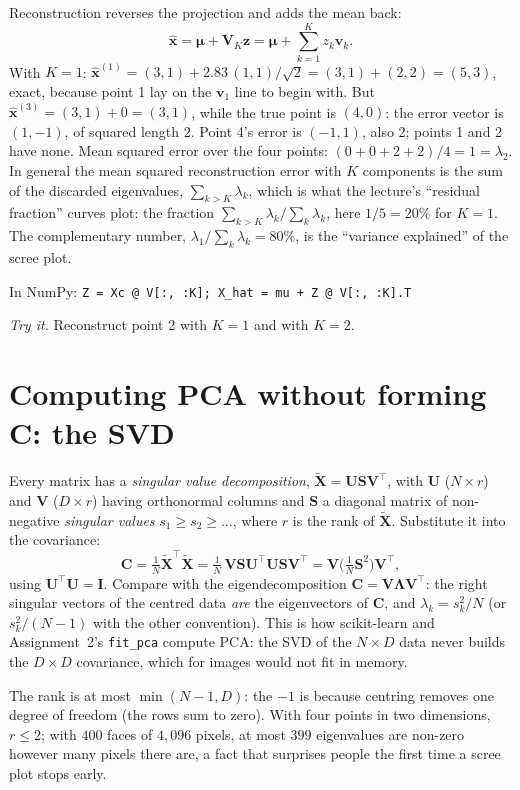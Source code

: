 \documentclass[11pt]{article}
\newcommand{\vx}{\bm{x}}
\newcommand{\vv}{\bm{v}}
\newcommand{\vz}{\bm{z}}
\newcommand{\vmu}{\bm{\mu}}
\newcommand{\mX}{\bm{X}}
\newcommand{\mC}{\bm{C}}
\newcommand{\mV}{\bm{V}}
\newcommand{\mI}{\bm{I}}
\newcommand{\mL}{\bm{\Lambda}}
\newcommand{\np}[1]{{\small\color{lightgray}In NumPy: \texttt{#1}}\par}
\begin{document}
Reconstruction reverses the projection and adds the mean back:
\[
\hat{\vx} = \vmu + \mV_K\vz = \vmu + \sum_{k=1}^{K} z_k\vv_k .
\]
With $K = 1$: $\hat{\vx}^{(1)} = (3, 1) + 2.83\,(1, 1)/\sqrt2 = (3, 1) + (2, 2) = (5, 3)$,
exact, because point 1 lay on the $\vv_1$ line to begin with. But
$\hat{\vx}^{(3)} = (3, 1) + 0 = (3, 1)$, while the true point is $(4, 0)$: the error
vector is $(1, -1)$, of squared length $2$. Point 4's error is $(-1, 1)$, also $2$; points
1 and 2 have none. Mean squared error over the four points: $(0 + 0 + 2 + 2)/4 = 1 =
\lambda_2$. In general the mean squared reconstruction error with $K$ components is the
sum of the discarded eigenvalues, $\sum_{k > K}\lambda_k$, which is what the lecture's
``residual fraction'' curves plot: the fraction $\sum_{k>K}\lambda_k / \sum_k\lambda_k$,
here $1/5 = 20\%$ for $K=1$. The complementary number, $\lambda_1 / \sum_k\lambda_k =
80\%$, is the ``variance explained'' of the scree plot.

\np{Z = Xc @ V[:, :K]; X\_hat = mu + Z @ V[:, :K].T}

\textit{Try it.} Reconstruct point 2 with $K = 1$ and with $K = 2$.

\section{Computing PCA without forming C: the SVD}
\label{sec:svd}

Every matrix has a \emph{singular value decomposition}, $\tilde{\mX} = \bm{U}\bm{S}\mV^{\top}$,
with $\bm{U}$ ($N\times r$) and $\mV$ ($D\times r$) having orthonormal columns and $\bm S$
a diagonal matrix of non-negative \emph{singular values} $s_1 \ge s_2 \ge \dots$, where $r$
is the rank of $\tilde{\mX}$. Substitute it into the covariance:
\[
\mC = \tfrac1N\tilde{\mX}^{\top}\tilde{\mX} = \tfrac1N\,\mV\bm S\bm U^{\top}\bm U\bm S\mV^{\top}
= \mV\Big(\tfrac{1}{N}\bm S^2\Big)\mV^{\top},
\]
using $\bm U^{\top}\bm U = \mI$. Compare with the eigendecomposition $\mC = \mV\mL\mV^{\top}$:
the right singular vectors of the centred data \emph{are} the eigenvectors of $\mC$, and
$\lambda_k = s_k^2/N$ (or $s_k^2/(N-1)$ with the other convention). This is how
scikit-learn and Assignment~2's \texttt{fit\_pca} compute PCA: the SVD of the $N\times D$
data never builds the $D\times D$ covariance, which for images would not fit in memory.

The rank is at most $\min(N - 1, D)$: the $-1$ is because centring removes one degree of
freedom (the rows sum to zero). With four points in two dimensions, $r \le 2$; with $400$
faces of $4{,}096$ pixels, at most $399$ eigenvalues are non-zero however many pixels
there are, a fact that surprises people the first time a scree plot stops early.
\end{document}
